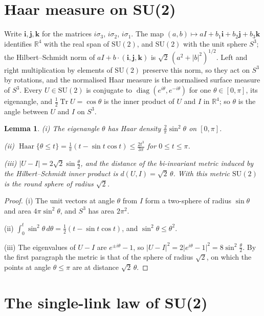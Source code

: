 \documentclass[aps,prd,twocolumn,superscriptaddress,nofootinbib,longbibliography,floatfix,amsmath,amssymb,10pt]{revtex4-2}
\newtheorem{lemma}[theorem]{Lemma}
\theoremstyle{definition}
\theoremstyle{remark}
\newcommand{\R}{\mathbb{R}}
\newcommand{\SU}{\mathrm{SU}}
\newcommand{\Tr}{\operatorname{Tr}}
\begin{document}
\section{Haar measure on SU(2)}\label{app:haar}

Write $\mathbf i,\mathbf j,\mathbf k$ for the matrices $i\sigma_3$,
$i\sigma_2$, $i\sigma_1$. The map $(a,b)\mapsto aI+b_1\mathbf i+b_2\mathbf j
+b_3\mathbf k$ identifies $\R^4$ with the real span of $\SU(2)$, and
$\SU(2)$ with the unit sphere $S^3$; the Hilbert--Schmidt norm of
$aI+b\cdot(\mathbf i,\mathbf j,\mathbf k)$ is $\sqrt2\,(a^2+\lvert b
\rvert^2)^{1/2}$. Left and right multiplication by elements of $\SU(2)$
preserve this norm, so they act on $S^3$ by rotations, and the normalised
Haar measure is the normalised surface measure of $S^3$. Every $U\in\SU(2)$
is conjugate to $\operatorname{diag}(e^{i\theta},e^{-i\theta})$ for one
$\theta\in[0,\pi]$, its eigenangle, and $\frac12\Tr U=\cos\theta$ is the
inner product of $U$ and $I$ in $\R^4$; so $\theta$ is the angle between
$U$ and $I$ on $S^3$.

\begin{lemma}\label{lem:haarsu2}
\textup{(i)} The eigenangle $\theta$ has Haar density $\frac2\pi\sin^2
\theta$ on $[0,\pi]$.

\textup{(ii)} $\operatorname{Haar}\{\theta\le t\}=\frac1\pi(t-\sin t\cos t)
\le\frac{2t^3}{3\pi}$ for $0\le t\le\pi$.

\textup{(iii)} $\lvert U-I\rvert=2\sqrt2\sin\frac\theta2$, and the distance
of the bi-invariant metric induced by the Hilbert--Schmidt inner product is
$d(U,I)=\sqrt2\,\theta$. With this metric $\SU(2)$ is the round sphere of
radius $\sqrt2$.
\end{lemma}

\begin{proof}
(i) The unit vectors at angle $\theta$ from $I$ form a two-sphere of radius
$\sin\theta$ and area $4\pi\sin^2\theta$, and $S^3$ has area $2\pi^2$.

(ii) $\int_0^t\sin^2\theta\,d\theta=\frac12(t-\sin t\cos t)$, and
$\sin^2\theta\le\theta^2$.

(iii) The eigenvalues of $U-I$ are $e^{\pm i\theta}-1$, so $\lvert U-I
\rvert^2=2\lvert e^{i\theta}-1\rvert^2=8\sin^2\frac\theta2$. By the first
paragraph the metric is that of the sphere of radius $\sqrt2$, on which the
points at angle $\theta\le\pi$ are at distance $\sqrt2\,\theta$.
\end{proof}

\section{The single-link law of SU(2)}\label{app:sharp}
\end{document}

